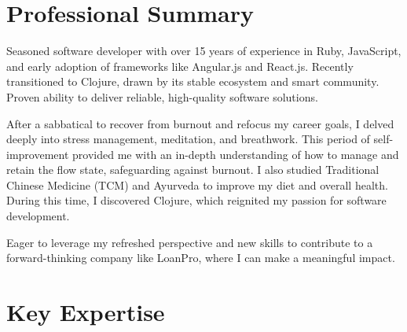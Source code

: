 
\section{Professional Summary}

Seasoned software developer with over 15 years of experience in Ruby, JavaScript, and early adoption of frameworks like Angular.js and React.js. Recently transitioned to Clojure, drawn by its stable ecosystem and smart community. Proven ability to deliver reliable, high-quality software solutions.

After a sabbatical to recover from burnout and refocus my career goals, I delved deeply into stress management, meditation, and breathwork. This period of self-improvement provided me with an in-depth understanding of how to manage and retain the flow state, safeguarding against burnout. I also studied Traditional Chinese Medicine (TCM) and Ayurveda to improve my diet and overall health. During this time, I discovered Clojure, which reignited my passion for software development.

Eager to leverage my refreshed perspective and new skills to contribute to a forward-thinking company like LoanPro, where I can make a meaningful impact.


\section{Key Expertise}

